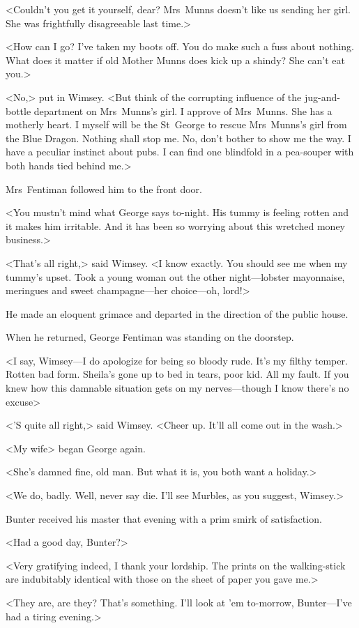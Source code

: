 <Couldn't you get it yourself, dear? Mrs~Munns doesn't like us sending her girl. She was frightfully disagreeable last time.>

<How can I go? I've taken my boots off. You do make such a fuss about nothing. What does it matter if old Mother Munns does kick up a shindy? She can't eat you.>

<No,> put in Wimsey. <But think of the corrupting influence of the jug-and-bottle department on Mrs~Munns's girl. I approve of Mrs~Munns. She has a motherly heart. I myself will be the St~George to rescue Mrs~Munns's girl from the Blue Dragon. Nothing shall stop me. No, don't bother to show me the way. I have a peculiar instinct about pubs. I can find one blindfold in a pea-souper with both hands tied behind me.>

Mrs~Fentiman followed him to the front door.

<You mustn't mind what George says to-night. His tummy is feeling rotten and it makes him irritable. And it has been so worrying about this wretched money business.>

<That's all right,> said Wimsey. <I know exactly. You should see me when my tummy's upset. Took a young woman out the other night—lobster mayonnaise, meringues and sweet champagne—her choice—oh, lord!>

He made an eloquent grimace and departed in the direction of the public house.

When he returned, George Fentiman was standing on the doorstep.

<I say, Wimsey—I do apologize for being so bloody rude. It's my filthy temper. Rotten bad form. Sheila's gone up to bed in tears, poor kid. All my fault. If you knew how this damnable situation gets on my nerves—though I know there's no excuse\longdots>

<'S quite all right,> said Wimsey. <Cheer up. It'll all come out in the wash.>

<My wife\longdash> began George again.

<She's damned fine, old man. But what it is, you both want a holiday.>

<We do, badly. Well, never say die. I'll see Murbles, as you suggest, Wimsey.>

Bunter received his master that evening with a prim smirk of satisfaction.

<Had a good day, Bunter?>

<Very gratifying indeed, I thank your lordship. The prints on the walking-stick are indubitably identical with those on the sheet of paper you gave me.>

<They are, are they? That's something. I'll look at 'em to-morrow, Bunter—I've had a tiring evening.>